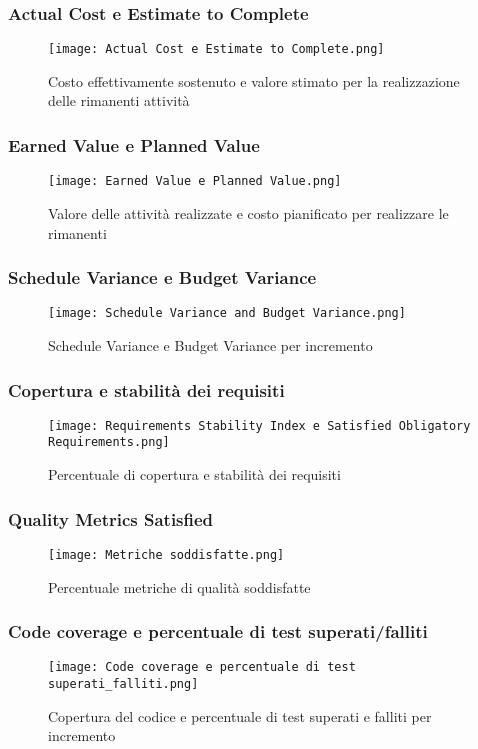     \subsubsection{Actual Cost e Estimate to Complete}
    \begin{figure}[H]
      \centering
      \texttt{[image: Actual Cost e Estimate to Complete.png]}
      \caption{Costo effettivamente sostenuto e valore stimato per la realizzazione delle rimanenti attività}
    \end{figure}

    \subsubsection{Earned Value e Planned Value}
    \begin{figure}[H]
      \centering
      \texttt{[image: Earned Value e Planned Value.png]}
      \caption{Valore delle attività realizzate e costo pianificato per realizzare le rimanenti}
    \end{figure}

    \subsubsection{Schedule Variance e Budget Variance}
    \begin{figure}[H]
      \centering
      \texttt{[image: Schedule Variance and Budget Variance.png]}
      \caption{Schedule Variance e Budget Variance per incremento}
    \end{figure}

    \subsubsection{Copertura e stabilità dei requisiti}
    \begin{figure}[H]
      \centering
      \texttt{[image: Requirements Stability Index e Satisfied Obligatory Requirements.png]}
      \caption{Percentuale di copertura e stabilità dei requisiti}
    \end{figure}

    \subsubsection{Quality Metrics Satisfied}
    \begin{figure}[H]
      \centering
      \texttt{[image: Metriche soddisfatte.png]}
      \caption{Percentuale metriche di qualità soddisfatte}
    \end{figure}

    \subsubsection{Code coverage e percentuale di test superati/falliti}
    \begin{figure}[H]
      \centering
      \texttt{[image: Code coverage e percentuale di test superati\_falliti.png]}
      \caption{Copertura del codice e percentuale di test superati e falliti per incremento}
    \end{figure}
